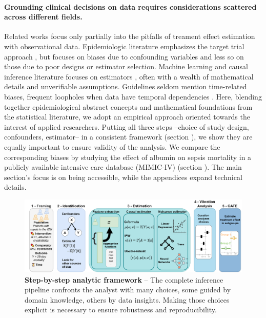\documentclass[10pt,letterpaper]{article}
\begin{document}
\paragraph{Grounding clinical decisions on data requires considerations scattered across different fields.}

Related works focus only partially into the pitfalls of treament effect estimation with observational data.
Epidemiologic literature emphasizes the target trial approach
\cite{von2007strengthening,benchimol2015reporting,hernan2020causal,schneeweiss2021conducting, zeng2022uncovering}, but focuses on biases due to
confounding variables and less so on those due to poor designs or estimator
selection.  Machine learning and causal inference literature focuses on
estimators \cite{belloni2014high, chernozhukov2018double,shalit2016tutorial,
  sharma2018tutorial,moraffah2021causal}, often with a wealth of mathematical details and unverifiable assumptions. Guidelines seldom mention time-related
biases, frequent loopholes when data have temporal dependencies
\cite{suissa2008immortal,fu2021timing}. Here, blending together epidemiological abstract concepts and mathematical foundations from the statistical literature, we adopt an empirical approach oriented towards the interest of applied researchers. Putting all three steps --choice of
study design, confounders, estimator-- in a consistent framework (section
), we show they are equally important to ensure validity
of the analysis. We compare the corresponding biases by studying the effect of
albumin on sepsis mortality in a publicly available intensive care database
(MIMIC-IV) \cite{johnson2020mimic} (section ).
The main section's focus is on being accessible, while the appendices expand
technical details.
%

\begin{figure}[t!]
  \centering
  \includegraphics[width=0.9\linewidth]{img/complete_inference_flow.pdf}
  \caption{\textbf{Step-by-step analytic framework} -- The complete
    inference pipeline confronts the analyst with
    many choices, some guided by domain knowledge, others
    by data insights. Making those choices explicit is necessary to ensure
    robustness and reproducibility.}\label{fig:inference_framework}
\end{figure}
\end{document}

